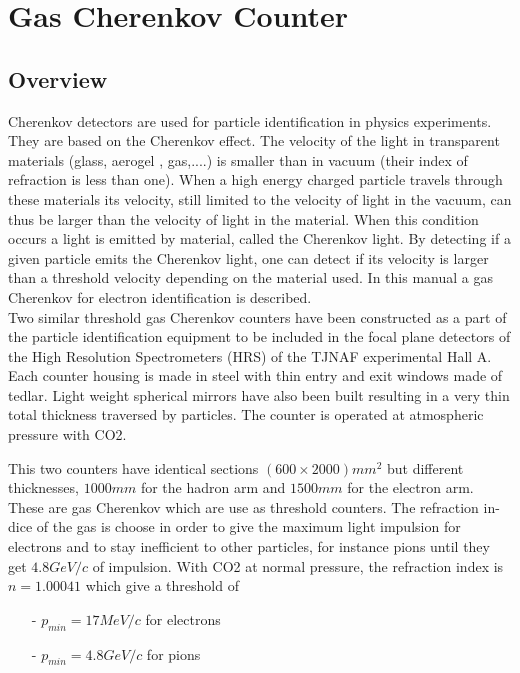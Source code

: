 \documentclass[12pt]{article}
\begin{document}
\section{Gas Cherenkov Counter}
\subsection{Overview}

Cherenkov detectors are used for particle identification in physics experiments. 
They are based on the Cherenkov effect. The velocity of the light in transparent materials 
(glass, aerogel , gas,....) is smaller than in vacuum (their index of refraction is less than one). When
a high energy charged particle travels through these materials its velocity,
still limited to the velocity of light in the vacuum, can thus be larger
than the velocity of light in the material. When this condition occurs a
light is emitted by material, called the Cherenkov light. By detecting if a given particle
emits the Cherenkov light, one can detect if its velocity is larger than a 
threshold velocity depending on the material used. In this manual a gas 
Cherenkov for electron identification is described.
\\
Two similar threshold gas Cherenkov counters have been constructed as a part
of the particle identification equipment to be included in the focal plane 
detectors of the High Resolution Spectrometers (HRS) of the TJNAF experimental
Hall A. Each counter housing is made in steel with thin entry and exit
windows made of tedlar. Light weight spherical mirrors have also been built 
resulting in a very thin total thickness traversed by particles. The counter is
operated at atmospheric pressure with CO2.

This two counters have identical sections $(600 \times 2000)mm^2$ but
different thicknesses, $1000mm$ for the hadron arm and $1500mm$ for the
electron arm. These are gas Cherenkov which are use as threshold counters. 
The refraction in-dice of the gas is choose in order to give the maximum
light impulsion for electrons and to stay inefficient to other particles, 
for instance pions until they get $4.8GeV/c$ of impulsion. 
With CO2 at normal pressure, the refraction 
index  is $n=1.00041$ which give a threshold of
\begin{itemize}
\item[-] $p_{min} = 17 MeV/c $ for electrons
\item[-] $p_{min} = 4.8 GeV/c $ for pions
\end{itemize}
\end{document}
